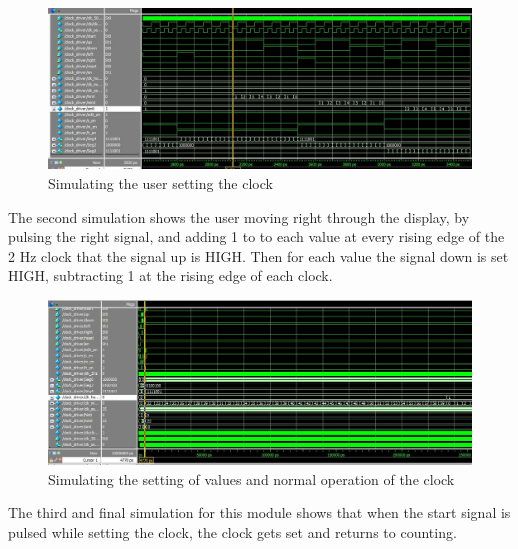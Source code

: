 \documentclass[a4paper]{article}
\begin{document}
\begin{figure}[H]
    \includegraphics[width=0.8 \linewidth]{images/clock_driver_sim2.JPG}
    \caption{Simulating the user setting the clock}
    \label{clock_driver_sim2}
\end{figure}
The second simulation shows the user moving right through the display, by pulsing the right signal, and adding 1 to to each value at every rising edge of the 2 Hz clock that the signal up is HIGH. Then for each value the signal down is set HIGH, subtracting 1 at the rising edge of each clock.

\begin{figure}[H]
    \includegraphics[width=0.8 \linewidth]{images/clock_driver_sim3.JPG}
    \caption{Simulating the setting of values and normal operation of the clock}
    \label{clock_driver_sim3}
\end{figure}
The third and final simulation for this module shows that when the start signal is pulsed while setting the clock, the clock gets set and returns to counting.
\end{document}
